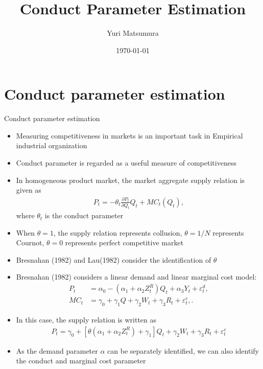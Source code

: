 \documentclass[aspectratio = 169]{beamer}
\title{Conduct Parameter Estimation}
\author{Yuri Matsumura}
\date{\today}
\theoremstyle{definition}
\begin{document}
\maketitle

\section{Conduct parameter estimation}
\begin{frame}{Conduct parameter estimation}
    \begin{itemize}
        \item Measuring competitiveness in markets is an important task in Empirical industrial organization
        \item Conduct parameter is regarded as a useful measure of competitiveness
        \item In homogeneous product market, the market aggregate supply relation is given as
        \begin{align*}
            P_t = -\theta_{t}\frac{\partial P_t}{\partial Q_t}Q_t + MC_t(Q_t),
        \end{align*}
        where $\theta_t$ is the conduct parameter
        \item When $\theta = 1$, the supply relation represents collusion, $\theta = 1/N$ represents Cournot, $\theta =0$ represents perfect competitive market
    \end{itemize}
\end{frame}

\begin{frame}{}
    \begin{itemize}
        \item Bresnahan (1982) and Lau(1982) consider the identification of $\theta$
        \item Bresnahan (1982) considers a linear demand and linear marginal cost model:
        \begin{align}
            P_t &= \alpha_0 - (\alpha_1 + \alpha_2Z^{R}_{t})Q_t + \alpha_3 Y_t + \varepsilon^{d}_{t},\label{eq:linear_demand}\\
            MC_t &= \gamma_0  + \gamma_1 Q + \gamma_2 W_{t} + \gamma_3 R_t + \varepsilon^{c}_{t},\label{eq:linear_marginal_cost}.
        \end{align}
        \item In this case, the supply relation is written as
        \begin{align}
            P_t = \gamma_0 + [\theta(\alpha_1 + \alpha_2Z^{R}_{t})+ \gamma_1] Q_t   + \gamma_2 W_{t} + \gamma_3 R_t + \varepsilon^{c}_{t}\label{eq:linear_supply_equation}
        \end{align}
        \item As the demand parameter $\alpha$ can be separately identified, we can also identify the conduct and marginal cost parameter
    \end{itemize}
\end{frame}
\end{document}
